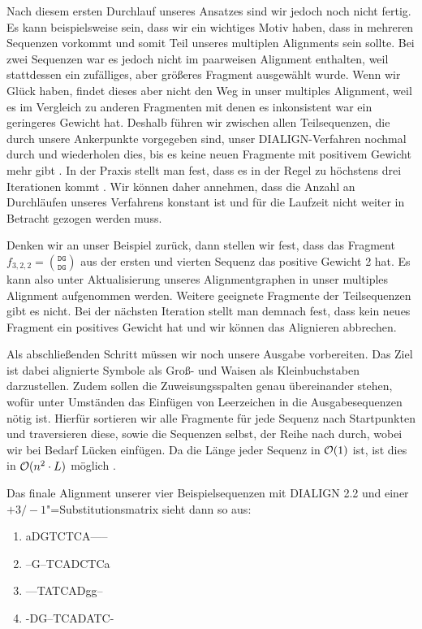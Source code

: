 Nach diesem ersten Durchlauf unseres Ansatzes sind wir jedoch noch nicht fertig. Es kann beispielsweise sein, dass wir ein wichtiges Motiv haben, dass in mehreren Sequenzen vorkommt und somit Teil unseres multiplen Alignments sein sollte. Bei zwei Sequenzen war es jedoch nicht im paarweisen Alignment enthalten, weil stattdessen ein zufälliges, aber größeres Fragment ausgewählt wurde. Wenn wir Glück haben, findet dieses aber nicht den Weg in unser multiples Alignment, weil es im Vergleich zu anderen Fragmenten mit denen es inkonsistent war ein geringeres Gewicht hat. Deshalb führen wir zwischen allen Teilsequenzen, die durch unsere Ankerpunkte vorgegeben sind, unser DIALIGN-Verfahren nochmal durch und wiederholen dies, bis es keine neuen Fragmente mit positivem Gewicht mehr gibt \citep{mdw96}. In der Praxis stellt man fest, dass es in der Regel zu höchstens drei Iterationen kommt \citep{m99}. Wir können daher annehmen, dass die Anzahl an Durchläufen unseres Verfahrens konstant ist und für die Laufzeit nicht weiter in Betracht gezogen werden muss.

Denken wir an unser Beispiel zurück, dann stellen wir fest, dass das Fragment $f_{3,2,2} = $$ {\texttt{DG}}\choose{\texttt{DG}}$ aus der ersten und vierten Sequenz das positive Gewicht 2 hat. Es kann also unter Aktualisierung unseres Alignmentgraphen in unser multiples Alignment aufgenommen werden. Weitere geeignete Fragmente der Teilsequenzen gibt es nicht. Bei der nächsten Iteration stellt man demnach fest, dass kein neues Fragment ein positives Gewicht hat und wir können das Alignieren abbrechen.

Als abschließenden Schritt müssen wir noch unsere Ausgabe vorbereiten. Das Ziel ist dabei alignierte Symbole als Groß- und Waisen als Kleinbuchstaben darzustellen. Zudem sollen die Zuweisungsspalten genau übereinander stehen, wofür unter Umständen das Einfügen  von Leerzeichen in die Ausgabesequenzen nötig ist. Hierfür sortieren wir alle Fragmente für jede Sequenz nach Startpunkten und traversieren diese, sowie die Sequenzen selbst, der Reihe nach durch, wobei wir bei Bedarf Lücken einfügen. Da die Länge jeder Sequenz in $\mathcal{O}(1)$ ist, ist dies in $\mathcal{O}(n^2\cdot L)$ möglich \citep{m99}. 

Das finale Alignment unserer vier Beispielsequenzen mit DIALIGN 2.2 und einer $+3/-1$"=Substitutionsmatrix sieht dann so aus:
\ttfamily
\begin{enumerate}[topsep=0pt,itemsep=-1ex,partopsep=1ex,parsep=1ex]
	\item aDGTCTCA-----
	\item --G--TCADCTCa
	\item ---TATCADgg--
	\item -DG--TCADATC-
\end{enumerate}
\normalfont 

